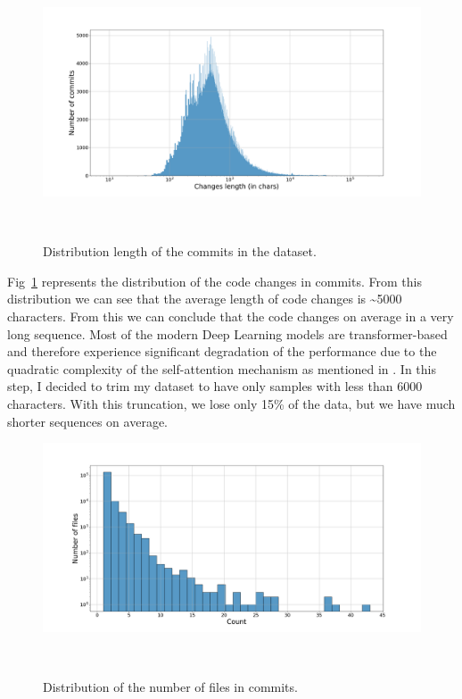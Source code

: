 \begin{figure}[H]
    \includegraphics[scale=0.30]{figs/changes_len_dist.png}
    \caption{Distribution length of the commits in the dataset.}~\label{fig:changes_len_dist}
\end{figure}
Fig~\ref{fig:changes_len_dist} represents the distribution of the code changes in commits. From this distribution we can see that the average length of code changes is \textasciitilde{}5000 characters. From this we can conclude that the code changes on average in a very long sequence. Most of the modern Deep Learning models are transformer-based and therefore experience significant degradation of the performance due to the quadratic complexity of the self-attention mechanism as mentioned in {}\cite{keles2023computational}. In this step, I decided to trim my dataset to have only samples with less than 6000 characters. With this truncation, we lose only 15\% of the data, but we have much shorter sequences on average.
\begin{figure}[H]
    \includegraphics[scale=0.30]{figs/Commit num files distribution.png}
    \caption{Distribution of the number of files in commits.}~\label{fig:Commit num files distribution}
\end{figure}

